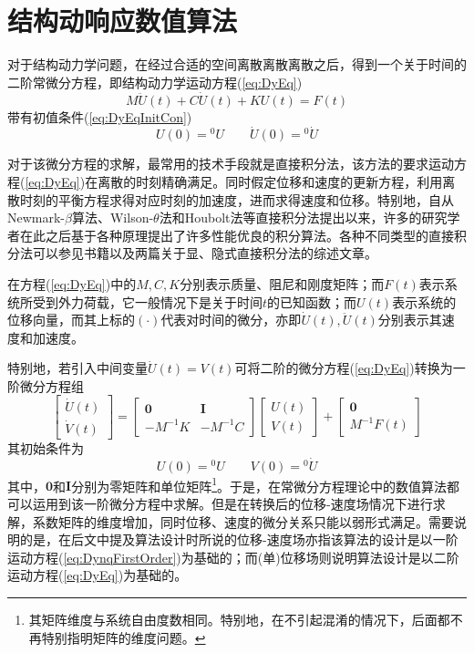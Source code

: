 \chapter{结构动响应数值算法}
对于结构动力学问题，在经过合适的空间离散离散离散之后，得到一个关于时间的二阶常微分方程，即结构动力学运动方程(\ref{eq:DyEq})
\begin{equation}
	M\ddot{U}(t)+C\dot{U}(t)+KU(t)=F(t)\label{eq:DyEq}
\end{equation}
带有初值条件(\ref{eq:DyEqInitCon})
\begin{equation}
{U}(0)={^0\!U}\qquad \dot{U}(0)={^0\!\dot{U}}\label{eq:DyEqInitCon}
\end{equation}

对于该微分方程的求解，最常用的技术手段就是直接积分法，该方法的要求运动方程(\ref{eq:DyEq})在离散的时刻精确满足。同时假定位移和速度的更新方程，利用离散时刻的平衡方程求得对应时刻的加速度，进而求得速度和位移。特别地，自从Newmark-$\beta$算法\cite{Newmark1959a}、Wilson-$\theta$法\cite{Wilson1968a}和Houbolt法\cite{Houbolt1950}等直接积分法提出以来，许多的研究学者在此之后基于各种原理提出了许多性能优良的积分算法。各种不同类型的直接积分法可以参见书籍\cite{Wood1990e,Hughes2000c,Zienkiewicz1991c,ErnstHairer1993a,ErnstHairer1996a}以及两篇关于显、隐式直接积分法的综述文章\cite{Dokainish1989a,Subbaraj1989b}。

在方程(\ref{eq:DyEq})中的$M,C,K$分别表示质量、阻尼和刚度矩阵；而$F(t)$表示系统所受到外力荷载，它一般情况下是关于时间$t$的已知函数；而$U(t)$表示系统的位移向量，而其上标的$(\cdot{})$代表对时间的微分，亦即$\dot{U}(t),\ddot{U}(t)$分别表示其速度和加速度。

特别地，若引入中间变量$\dot{U}(t)=V(t)$可将二阶的微分方程(\ref{eq:DyEq})转换为一阶微分方程组
\begin{equation}
\begin{bmatrix}
\dot{U}(t)\\
\dot{V}(t)
\end{bmatrix}=\begin{bmatrix}
\mathbf{0}&\mathbf{I}\\
-M^{-1}K&-M^{-1}C
\end{bmatrix}\begin{bmatrix}
{U}(t)\\
{V}(t)
\end{bmatrix}+\begin{bmatrix}
\mathbf{0}\\
M^{-1}F(t)
\end{bmatrix}\label{eq:DynqFirstOrder}
\end{equation}
其初始条件为
\begin{equation}
{U}(0)={^0\!U}\qquad V(0)={^0\!\dot{U}}
\end{equation}
其中，$\mathbf{0}$和$\mathbf{I}$分别为零矩阵和单位矩阵\footnote{其矩阵维度与系统自由度数相同。特别地，在不引起混淆的情况下，后面都不再特别指明矩阵的维度问题。}。于是，在常微分方程理论中的数值算法都可以运用到该一阶微分方程中求解。但是在转换后的位移-速度场情况下进行求解，系数矩阵的维度增加，同时位移、速度的微分关系只能以弱形式满足。需要说明的是，在后文中提及算法设计时所说的位移-速度场亦指该算法的设计是以一阶运动方程(\ref{eq:DynqFirstOrder})为基础的；而(单)位移场则说明算法设计是以二阶运动方程(\ref{eq:DyEq})为基础的。


